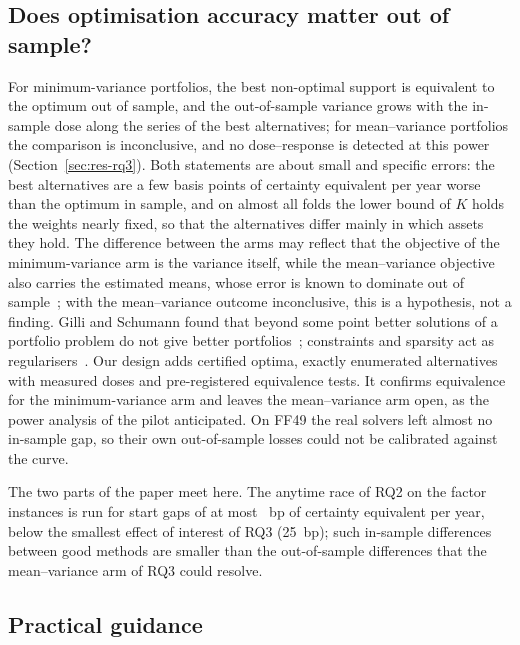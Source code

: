 \subsection{Does optimisation accuracy matter out of sample?}\label{sec:disc-oos}

For minimum-variance portfolios, the best non-optimal support is equivalent to the optimum out of sample, and the
out-of-sample variance grows with the in-sample dose along the series of the best alternatives; for mean--variance
portfolios the comparison is inconclusive, and no dose--response is detected at this power
(Section~\ref{sec:res-rq3}). Both statements are about small and specific errors: the best alternatives are a few basis
points of certainty equivalent per year worse than the optimum in sample, and on almost all folds the lower bound of
$K$ holds the weights nearly fixed, so that the alternatives differ mainly in which assets they hold. The difference between the
arms may reflect that the objective of the minimum-variance arm is the variance itself, while the mean--variance
objective also carries the estimated means, whose error is known to dominate out of
sample~\cite{michaud1989markowitz,kan2007optimal,demiguel2009optimal}; with the mean--variance outcome inconclusive,
this is a hypothesis, not a finding. Gilli and Schumann found that beyond some point better solutions of a portfolio
problem do not give better portfolios~\cite{gilli2011optimal,gilli2012heuristic}; constraints and sparsity act as
regularisers~\cite{jagannathan2003risk,brodie2009sparse}. Our design adds certified optima, exactly enumerated
alternatives with measured doses and pre-registered equivalence tests. It confirms equivalence for the minimum-variance
arm and leaves the mean--variance arm open, as the power analysis of the pilot anticipated. On FF49 the real solvers left
almost no in-sample gap, so their own out-of-sample losses could not be calibrated against the curve.

The two parts of the paper meet here. The anytime race of RQ2 on the factor instances is run for start gaps of at
most ~bp of certainty equivalent per year, below the smallest effect of interest of RQ3
(25~bp); such in-sample differences between good methods are smaller than the out-of-sample differences that the %
mean--variance arm of RQ3 could resolve.

\subsection{Practical guidance}\label{sec:disc-guidance}

